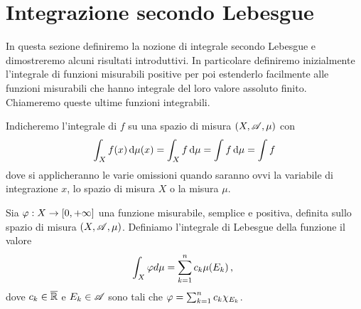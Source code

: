 \section{Integrazione secondo Lebesgue}
In questa sezione definiremo la nozione di integrale secondo Lebesgue e dimostreremo alcuni risultati introduttivi. In particolare definiremo inizialmente l'integrale di funzioni misurabili positive per poi estenderlo facilmente alle funzioni misurabili che hanno integrale del loro valore assoluto finito. Chiameremo queste ultime funzioni integrabili.

\begin{remark}
	Indicheremo l'integrale di $f$ su una spazio di misura $(X,\mathscr A,\mu)$ con 
	\begin{equation*}
		\int_X f(x) \,\mathrm d \mu(x)=\int_X f \,\mathrm d \mu=\int f \,\mathrm d \mu=\int f
	\end{equation*}
	dove si applicheranno le varie omissioni quando saranno ovvi la variabile di integrazione $x$, lo spazio di misura $X$ o la misura $\mu$.
\end{remark}

\begin{definition}\label{def:IntegraleSemplici}
	Sia $\varphi:X\to [0,+\infty]$ una funzione misurabile, semplice e positiva, definita sullo spazio di misura $(X,\mathscr A,\mu)$. Definiamo l'integrale di Lebesgue della funzione il valore
	\begin{equation*}
		\int_X \varphi d \mu = \sum_{k=1}^n c_k\mu(E_k)\, \text{, }
	\end{equation*}
	dove $c_k\in \overline{\mathbb R}$ e $E_k \in \mathscr A$ sono tali che $\varphi=\sum_{k=1}^nc_k\chi_{E_k}$.
\end{definition}

